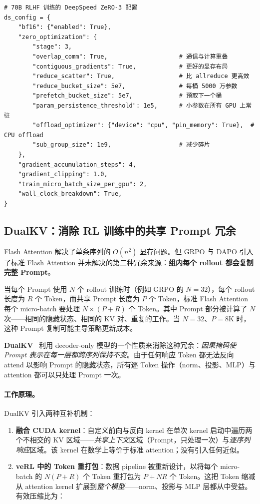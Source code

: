 \begin{lstlisting}[style=pythonstyle]
# 70B RLHF 训练的 DeepSpeed ZeRO-3 配置
ds_config = {
    "bf16": {"enabled": True},
    "zero_optimization": {
        "stage": 3,
        "overlap_comm": True,                    # 通信与计算重叠
        "contiguous_gradients": True,            # 更好的显存布局
        "reduce_scatter": True,                  # 比 allreduce 更高效
        "reduce_bucket_size": 5e7,               # 每桶 5000 万参数
        "prefetch_bucket_size": 5e7,             # 预取下一个桶
        "param_persistence_threshold": 1e5,      # 小参数在所有 GPU 上常驻
        "offload_optimizer": {"device": "cpu", "pin_memory": True},  # CPU offload
        "sub_group_size": 1e9,                   # 减少碎片
    },
    "gradient_accumulation_steps": 4,
    "gradient_clipping": 1.0,
    "train_micro_batch_size_per_gpu": 2,
    "wall_clock_breakdown": True,
}
\end{lstlisting}

\subsection{DualKV：消除 RL 训练中的共享 Prompt 冗余}
\label{dualkv-shared-prompt-rl-training}

Flash Attention 解决了单条序列的 $O(n^2)$ 显存问题。但 GRPO 与 DAPO 引入了标准 Flash Attention 并未解决的第二种冗余来源：\textbf{组内每个 rollout 都会复制完整 Prompt}。

当每个 Prompt 使用 $N$ 个 rollout 训练时（例如 GRPO 的 $N=32$），每个 rollout 长度为 $R$ 个 Token，而共享 Prompt 长度为 $P$ 个 Token，标准 Flash Attention 每个 micro-batch 要处理 $N \times (P + R)$ 个 Token。其中 Prompt 部分被计算了 $N$ 次——相同的隐藏状态、相同的 KV 对、重复的工作。当 $N=32$、$P=8\text{K}$ 时，这种 Prompt 复制可能主导策略更新成本。

\textbf{DualKV}~\cite{luo2025dualkv} 利用 decoder-only 模型的一个性质来消除这种冗余：\emph{因果掩码使 Prompt 表示在每一层都跨序列保持不变}。由于任何响应 Token 都无法反向 attend 以影响 Prompt 的隐藏状态，所有逐 Token 操作（norm、投影、MLP）与 attention 都可以只处理 Prompt 一次。

\paragraph{工作原理。}
DualKV 引入两种互补机制：

\begin{enumerate}
  \item \textbf{融合 CUDA kernel}：自定义前向与反向 kernel 在单次 kernel 启动中遍历两个不相交的 KV 区域——\emph{共享上下文}区域（Prompt，只处理一次）与\emph{逐序列响应}区域。该 kernel 在数学上等价于标准 attention；没有引入任何近似。
  \item \textbf{veRL 中的 Token 重打包}：数据 pipeline 被重新设计，以将每个 micro-batch 的 $N(P+R)$ 个 Token 重打包为 $P + NR$ 个 Token。这把 Token 缩减从 attention kernel 扩展到\emph{整个模型}——norm、投影与 MLP 层都从中受益。有效压缩比为：
\end{enumerate}

